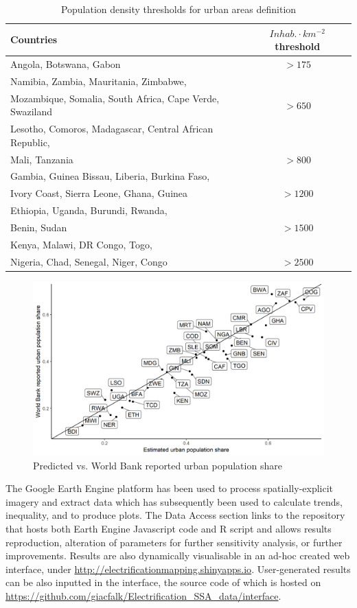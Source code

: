 \documentclass[preprint,12pt]{elsarticle}
\begin{document}
\begin{table}[H]
\footnotesize
    \caption{Population density thresholds for urban areas definition}
    \label{thresholds}
\begin{tabular}{lc}
\hline \hline
Countries & $Inhab. \cdot km^{-2}$ threshold \\ \hline
Angola, Botswana, Gabon & $>175$ \\ \hline
Namibia, Zambia, Mauritania, Zimbabwe, \\ Mozambique, Somalia, South Africa, Cape Verde, Swaziland & $>650$ \\ \hline
Lesotho, Comoros, Madagascar, Central African Republic,\\ Mali, Tanzania & $>800$ \\ \hline
Gambia, Guinea Bissau, Liberia, Burkina Faso,\\ Ivory Coast, Sierra Leone, Ghana, Guinea & $>1200$ \\ \hline
Ethiopia, Uganda, Burundi, Rwanda, \\ Benin, Sudan & $>1500$ \\ \hline
Kenya, Malawi, DR Congo, Togo, \\ Nigeria, Chad, Senegal, Niger, Congo & $>2500$ \\
\hline
\end{tabular}
\end{table}

\begin{figure}[H]
    \centering
    \includegraphics[scale=0.65]{figures/ruralvalid.png}
    \caption{Predicted vs. World Bank reported urban population share}
    \label{urvalid}
\end{figure}

The Google Earth Engine platform \citep{gorelick2017google} has been used to process spatially-explicit imagery and extract data which has subsequently been used to calculate trends, inequality, and to produce plots. The Data Access section links to the repository that hosts both Earth Engine Javascript code and R script and allows results reproduction, alteration of parameters for further sensitivity analysis, or further improvements. Results are also dynamically visualisable in an ad-hoc created web interface, under \url{http://electrificationmapping.shinyapps.io}. User-generated results can be also inputted in the interface, the source code of which is hosted on \url{https://github.com/giacfalk/Electrification_SSA_data/interface}.
\end{document}
